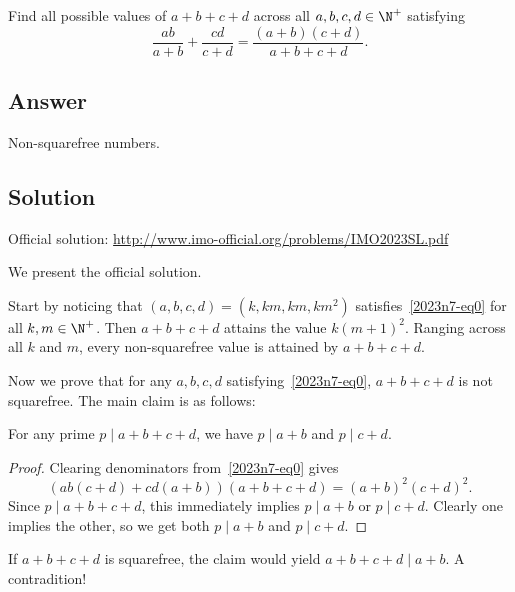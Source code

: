 Find all possible values of $a + b + c + d$ across all $a, b, c, d \in \N^+$ satisfying
\[ \frac{ab}{a + b} + \frac{cd}{c + d} = \frac{(a + b)(c + d)}{a + b + c + d}. \tag{*}\label{2023n7-eq0} \]



\subsection*{Answer}

Non-squarefree numbers.



\subsection*{Solution}

Official solution: \url{http://www.imo-official.org/problems/IMO2023SL.pdf}

We present the official solution.

Start by noticing that $(a, b, c, d) = (k, km, km, km^2)$ satisfies~\eqref{2023n7-eq0} for all $k, m \in \N^+$.
Then $a + b + c + d$ attains the value $k(m + 1)^2$.
Ranging across all $k$ and $m$, every non-squarefree value is attained by $a + b + c + d$.

Now we prove that for any $a, b, c, d$ satisfying~\eqref{2023n7-eq0}, $a + b + c + d$ is not squarefree.
The main claim is as follows:

\begin{claim}
For any prime $p \mid a + b + c + d$, we have $p \mid a + b$ and $p \mid c + d$.
\end{claim}
\begin{proof}
Clearing denominators from~\eqref{2023n7-eq0} gives
\[ (ab(c + d) + cd(a + b))(a + b + c + d) = (a + b)^2 (c + d)^2. \]
Since $p \mid a + b + c + d$, this immediately implies $p \mid a + b$ or $p \mid c + d$.
Clearly one implies the other, so we get both $p \mid a + b$ and $p \mid c + d$.
\end{proof}

If $a + b + c + d$ is squarefree, the claim would yield $a + b + c + d \mid a + b$.
A contradition!
